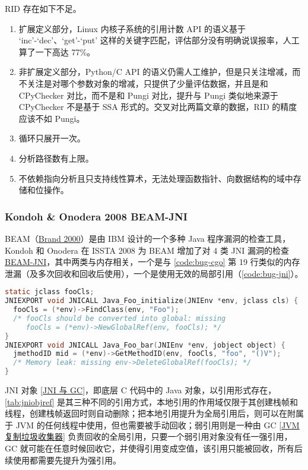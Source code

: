 RID 存在如下不足。

\begin{enumerate}
\item 扩展定义部分，Linux 内核子系统的引用计数 API 的语义基于 `inc'-`dec'、`get'-`put' 这样的关键字匹配，评估部分没有明确说误报率，人工算了一下高达 77\%。
\item 非扩展定义部分，Python/C API 的语义仍需人工维护，但是只关注增减，而不关注是对哪个参数对象的增减，只提供了少量评估数据，并且是和 CPyChecker 对比，而不是和 Pungi 对比，提升与 Pungi 类似地来源于 CPyChecker 不是基于 SSA 形式的。交叉对比两篇文章的数据，RID 的精度应该不如 Pungi。
\item 循环只展开一次。
\item 分析路径数有上限。
\item 不依赖指向分析且只支持线性算术，无法处理函数指针、向数据结构的域中存储和位操作。
\end{enumerate}

\subsubsection{Kondoh \& Onodera 2008 BEAM-JNI}

BEAM（\href{https://ieeexplore.ieee.org/document/885870}{Brand 2000}）是由 IBM 设计的一个多种 Java 程序漏洞的检查工具，Kondoh 和 Onodera 在 ISSTA 2008 为 BEAM 增加了对 4 类 JNI 漏洞的检查 \href{https://dl.acm.org/doi/10.1145/1390630.1390645}{BEAM-JNI}，其中两类与内存相关，一个是与 \autoref{code:bug-cgo} 第 19 行类似的内存泄漏（及多次回收和回收后使用），一个是使用无效的局部引用（\autoref{code:bug-jni}）。

\begin{lstfloat}
\begin{lstlisting}[language={C},caption={错误的 JNI 程序},label={code:bug-jni}]
static jclass fooCls;
JNIEXPORT void JNICALL Java_Foo_initialize(JNIEnv *env, jclass cls) {
  fooCls = (*env)->FindClass(env, "Foo");
  /* fooCls should be converted into global: missing
     fooCls = (*env)->NewGlobalRef(env, fooCls); */
}
JNIEXPORT void JNICALL Java_Foo_bar(JNIEnv *env, jobject object) {
  jmethodID mid = (*env)->GetMethodID(env, fooCls, "foo", "()V");
  /* Memory leak: missing env->DeleteGlobalRef(fooCls); */
}
\end{lstlisting}
\end{lstfloat}

JNI 对象 [\href{https://www.ibm.com/docs/en/sdk-java-technology/8?topic=jni-garbage-collector}{JNI 与 GC}]，即底层 C 代码中的 Java 对象，以引用形式存在，\autoref{tab:jniobjref} 是其三种不同的引用方式，本地引用的作用域仅限于其创建栈帧和线程，创建栈帧返回时则自动删除；把本地引用提升为全局引用后，则可以在附属于 JVM 的任何线程中使用，但也需要被手动回收；弱引用则是一种由 GC [\href{https://stackoverflow.com/questions/9465767/if-the-jvm-keeps-moving-objects-around-when-it-does-gc-how-does-it-resolve-refe}{JVM 复制垃圾收集器}] 负责回收的全局引用，只要一个弱引用对象没有任一强引用，GC 就可能在任意时候回收它，并使得引用变成空值，该引用只能被回收，所有后续使用都需要先提升为强引用。

